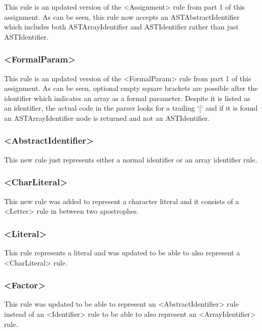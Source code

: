 \documentclass{article}
\begin{document}
								This rule is an updated version of the \textless Assignment\textgreater{} rule from part 1 of this assignment. As can be seen, this rule now accepts an ASTAbstractIdentifier which includes both ASTArrayIdentifier and ASTIdentifier rather than just ASTIdentifier.
				
				
				\subsubsection{\textless FormalParam\textgreater}
				
				This rule is an updated version of the \textless FormalParam\textgreater{} rule from part 1 of this assignment. As can be seen, optional empty square brackets are possible after the identifier which indicates an array as a formal parameter. Despite it is listed as an identifier, the actual code in the parser looks for a trailing `[` and if it is found an ASTArrayIdentifier node is returned and not an ASTIdentifier.
				
				\subsubsection{\textless AbstractIdentifier\textgreater}
				
				This new rule just represents either a normal identifier or an array identifier rule.
								
				
				\subsubsection{\textless CharLiteral\textgreater}
				
				This new rule was added to represent a character literal and it consists of a \textless Letter\textgreater{} rule in between two apostrophes.
				
				\subsubsection{\textless Literal\textgreater}
				
				This rule represents a literal and was updated to be able to also represent a \textless CharLiteral\textgreater {} rule.
				
				\subsubsection{\textless Factor\textgreater}
				
				This rule was updated to be able to represent an \textless AbstractIdentifier\textgreater{} rule instead of an \textless Identifier\textgreater{} rule to be able to also represent an \textless ArrayIdentifier\textgreater{} rule.
				
\end{document}
